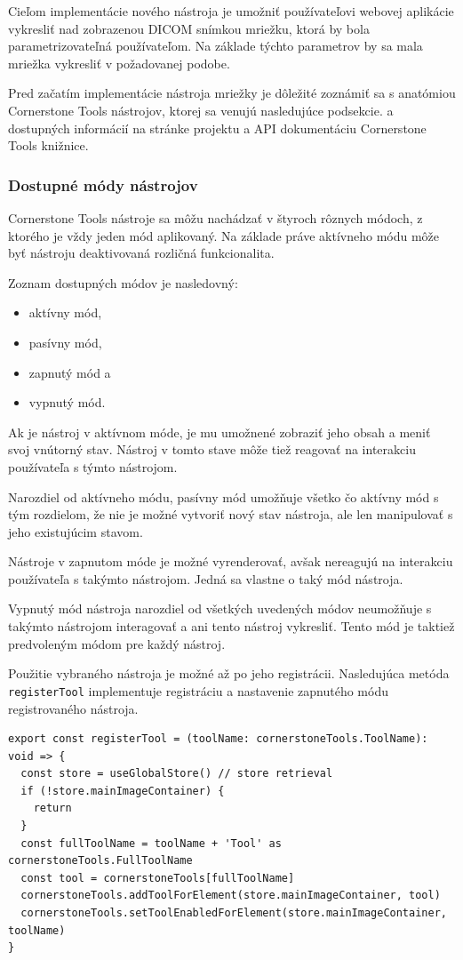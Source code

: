 Cieľom implementácie nového nástroja je umožniť používateľovi webovej aplikácie vykresliť nad zobrazenou DICOM snímkou mriežku, ktorá by bola parametrizovateľná používateľom. Na základe týchto parametrov by sa mala mriežka vykresliť v požadovanej podobe.

Pred začatím implementácie nástroja mriežky je dôležité zoznámiť sa s anatómiou Cornerstone Tools nástrojov, ktorej sa venujú nasledujúce podsekcie. a dostupných informácií na stránke projektu a API dokumentáciu Cornerstone Tools knižnice. 

\subsubsection {Dostupné módy nástrojov}
Cornerstone Tools nástroje sa môžu nachádzať v štyroch rôznych módoch, z ktorého je vždy jeden mód aplikovaný. Na základe práve aktívneho módu môže byť nástroju deaktivovaná rozličná funkcionalita.

Zoznam dostupných módov je nasledovný:
\begin {itemize}
\item {aktívny mód,}
\item {pasívny mód,}
\item {zapnutý mód a}
\item {vypnutý mód.}
\end {itemize}

Ak je nástroj v aktívnom móde, je mu umožnené zobraziť jeho obsah a meniť svoj vnútorný stav. Nástroj v tomto stave môže tiež reagovať na interakciu používateľa s týmto nástrojom.

Narozdiel od aktívneho módu, pasívny mód umožňuje všetko čo aktívny mód s tým rozdielom, že nie je možné vytvoriť nový stav nástroja, ale len manipulovať s jeho existujúcim stavom.

Nástroje v zapnutom móde je možné vyrenderovať, avšak nereagujú na interakciu používateľa s takýmto nástrojom. Jedná sa vlastne o taký  mód nástroja.

Vypnutý mód nástroja narozdiel od všetkých uvedených módov neumožňuje s takýmto nástrojom interagovať a ani tento nástroj vykresliť. Tento mód je taktiež predvoleným módom pre každý nástroj. 

Použitie vybraného nástroja je možné až po jeho registrácii. Nasledujúca metóda \texttt{registerTool} implementuje registráciu a nastavenie zapnutého módu registrovaného nástroja.
\begin{verbatim}
export const registerTool = (toolName: cornerstoneTools.ToolName): void => {
  const store = useGlobalStore() // store retrieval
  if (!store.mainImageContainer) {
    return
  }
  const fullToolName = toolName + 'Tool' as cornerstoneTools.FullToolName
  const tool = cornerstoneTools[fullToolName]
  cornerstoneTools.addToolForElement(store.mainImageContainer, tool)
  cornerstoneTools.setToolEnabledForElement(store.mainImageContainer, toolName)
}
\end{verbatim}

